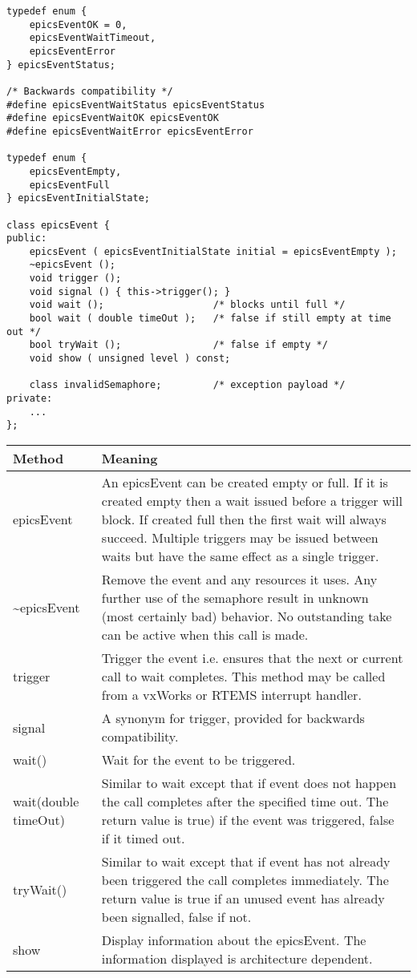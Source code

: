 \begin{verbatim}
typedef enum {
    epicsEventOK = 0,
    epicsEventWaitTimeout,
    epicsEventError
} epicsEventStatus;

/* Backwards compatibility */
#define epicsEventWaitStatus epicsEventStatus
#define epicsEventWaitOK epicsEventOK
#define epicsEventWaitError epicsEventError

typedef enum {
    epicsEventEmpty,
    epicsEventFull
} epicsEventInitialState;

class epicsEvent {
public:
    epicsEvent ( epicsEventInitialState initial = epicsEventEmpty );
    ~epicsEvent ();
    void trigger ();
    void signal () { this->trigger(); }
    void wait ();                   /* blocks until full */
    bool wait ( double timeOut );   /* false if still empty at time out */
    bool tryWait ();                /* false if empty */
    void show ( unsigned level ) const;

    class invalidSemaphore;         /* exception payload */
private:
    ...
};
\end{verbatim}

\begin{center}
\begin{longtable}{p{1.25in}p{5.0in}}
\textbf{Method} & \textbf{Meaning}\\
\hline
epicsEvent & An epicsEvent can be created empty or full.
If it is created empty then a wait issued before a trigger will block.
If created full then the first wait will always succeed.
Multiple triggers may be issued between waits but have the same effect as a single trigger.\\
\~{}epicsEvent & Remove the event and any resources it uses.
Any further use of the semaphore result in unknown (most certainly bad) behavior.
No outstanding take can be active when this call is made.\\
trigger & Trigger the event i.e. ensures that the next or current call to wait completes.
This method may be called from a vxWorks or RTEMS interrupt handler.\\
signal & A synonym for trigger, provided for backwards compatibility.\\
wait() & Wait for the event to be triggered.\\
wait(double timeOut) & Similar to wait except that if event does not happen the call completes after the specified time out.
The return value is true) if the event was triggered, false if it timed out.\\
tryWait() & Similar to wait except that if event has not already been triggered the call completes immediately.
The return value is true if an unused event has already been signalled, false if not.\\
show & Display information about the epicsEvent.
The information displayed is architecture dependent.
\end{longtable}
\end{center}

